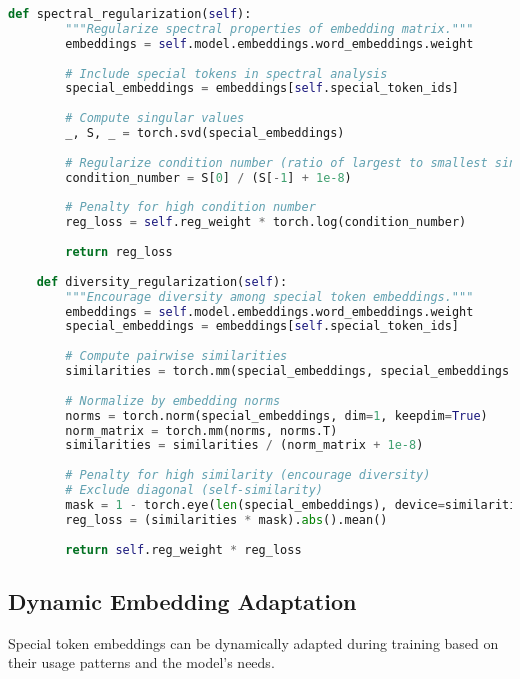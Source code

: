 \begin{lstlisting}[language=Python, caption=Regularization techniques for special token embeddings]
    def spectral_regularization(self):
        """Regularize spectral properties of embedding matrix."""
        embeddings = self.model.embeddings.word_embeddings.weight
        
        # Include special tokens in spectral analysis
        special_embeddings = embeddings[self.special_token_ids]
        
        # Compute singular values
        _, S, _ = torch.svd(special_embeddings)
        
        # Regularize condition number (ratio of largest to smallest singular value)
        condition_number = S[0] / (S[-1] + 1e-8)
        
        # Penalty for high condition number
        reg_loss = self.reg_weight * torch.log(condition_number)
        
        return reg_loss
        
    def diversity_regularization(self):
        """Encourage diversity among special token embeddings."""
        embeddings = self.model.embeddings.word_embeddings.weight
        special_embeddings = embeddings[self.special_token_ids]
        
        # Compute pairwise similarities
        similarities = torch.mm(special_embeddings, special_embeddings.T)
        
        # Normalize by embedding norms
        norms = torch.norm(special_embeddings, dim=1, keepdim=True)
        norm_matrix = torch.mm(norms, norms.T)
        similarities = similarities / (norm_matrix + 1e-8)
        
        # Penalty for high similarity (encourage diversity)
        # Exclude diagonal (self-similarity)
        mask = 1 - torch.eye(len(special_embeddings), device=similarities.device)
        reg_loss = (similarities * mask).abs().mean()
        
        return self.reg_weight * reg_loss
\end{lstlisting}

\subsection{Dynamic Embedding Adaptation}

Special token embeddings can be dynamically adapted during training based on their usage patterns and the model's needs.

